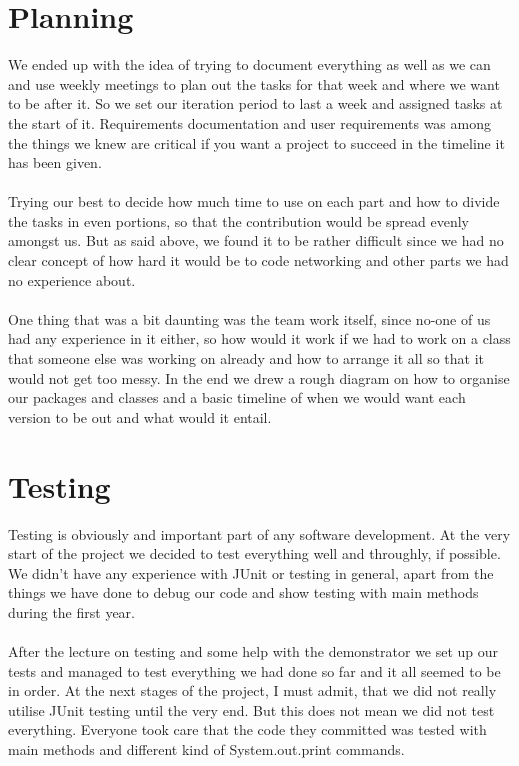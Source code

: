 \section{Planning}
\label{sec: planning}
We ended up with the idea of trying to document everything as well as we can and use weekly meetings to plan out the tasks for that week and where we want to be after it. So we set our iteration period to last a week and assigned tasks at the start of it. Requirements documentation and user requirements was among the things we knew are critical if you want a project to succeed in the timeline it has been given.\\\\
Trying our best to decide how much time to use on each part and how to divide the tasks in even portions, so that the contribution would be spread evenly amongst us. But as said above, we found it to be rather difficult since we had no clear concept of how hard it would be to code networking and other parts we had no experience about.\\\\
One thing that was a bit daunting was the team work itself, since no-one of us had any experience in it either, so how would it work if we had to work on a class that someone else was working on already and how to arrange it all so that it would not get too messy.
In the end we drew a rough diagram on how to organise our packages and classes and a basic timeline of when we would want each version to be out and what would it entail.

\section{Testing}
\label{sec: se_testing}
Testing is obviously and important part of any software development. At the very start of the project we decided to test everything well and throughly, if possible. We didn't have any experience with JUnit or testing in general, apart from the things we have done to debug our code and show testing with main methods during the first year.\\\\
After the lecture on testing and some help with the demonstrator we set up our tests and managed to test everything we had done so far and it all seemed to be in order. At the next stages of the project, I must admit, that we did not really utilise JUnit testing until the very end. But this does not mean we did not test everything. Everyone took care that the code they committed was tested with main methods and different kind of System.out.print commands.

